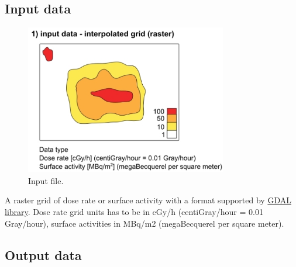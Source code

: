 \subsection{Input data}
\label{input-data}

\begin{figure}[H]
    \centering
      \includegraphics[width=250pt]{./pictures/input.jpg}
      \caption{Input file.}
      \label{fig:input}
\end{figure}

A raster grid of dose rate or surface activity with a format supported
by \href{http://www.gdal.org/formats_list.html}{GDAL library}. Dose rate
grid units has to be in cGy/h (centiGray/hour = 0.01 Gray/hour), surface
activities in MBq/m2 (megaBecquerel per square meter).

\subsection{Output data}
\label{output-data}

